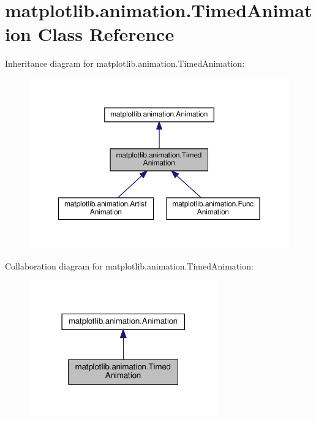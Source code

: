 \hypertarget{classmatplotlib_1_1animation_1_1TimedAnimation}{}\section{matplotlib.\+animation.\+Timed\+Animation Class Reference}
\label{classmatplotlib_1_1animation_1_1TimedAnimation}


Inheritance diagram for matplotlib.\+animation.\+Timed\+Animation\+:
\nopagebreak
\begin{figure}[H]
\begin{center}
\leavevmode
\includegraphics[width=350pt]{classmatplotlib_1_1animation_1_1TimedAnimation__inherit__graph}
\end{center}
\end{figure}


Collaboration diagram for matplotlib.\+animation.\+Timed\+Animation\+:
\nopagebreak
\begin{figure}[H]
\begin{center}
\leavevmode
\includegraphics[width=230pt]{classmatplotlib_1_1animation_1_1TimedAnimation__coll__graph}
\end{center}
\end{figure}
